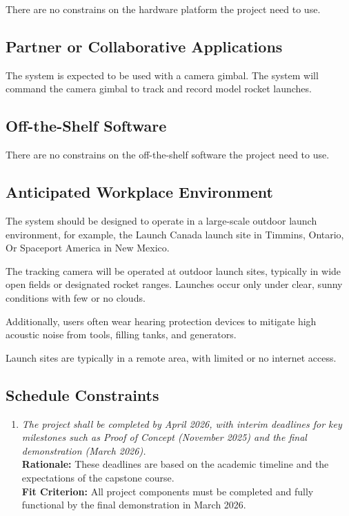 \documentclass[12pt]{article}
\begin{document}
There are no constrains on the hardware platform the project need to use.

\subsection{Partner or Collaborative Applications}

The system is expected to be used with a camera gimbal. The system will command
the camera gimbal to track and record model rocket launches.

\subsection{Off-the-Shelf Software}

There are no constrains on the off-the-shelf software the project need to use.

\subsection{Anticipated Workplace Environment}

The system should be designed to operate in a large-scale outdoor launch
environment, for example, the Launch Canada launch site in Timmins, Ontario, Or
Spaceport America in New Mexico.

The tracking camera will be operated at outdoor launch sites, typically in wide
open fields or designated rocket ranges. Launches occur only under clear, sunny
conditions with few or no clouds.

Additionally, users often wear hearing protection devices to mitigate high
acoustic noise from tools, filling tanks, and generators.

Launch sites are typically in a remote area, with limited or no internet
access.

\subsection{Schedule Constraints}

\begin{enumerate}[label=SCHD \arabic*., wide=0pt, leftmargin=*]
  \item \emph{The project shall be completed by April 2026, with
          interim deadlines for key milestones such as Proof of Concept
          (November 2025) and the final demonstration (March 2026).}\\[2mm]
        {\bf Rationale:} These deadlines are based on the academic
        timeline and the expectations of the capstone course.\\
        {\bf Fit Criterion:} All project components must be completed and
        fully functional by the final demonstration in March 2026.
\end{enumerate}
\end{document}
